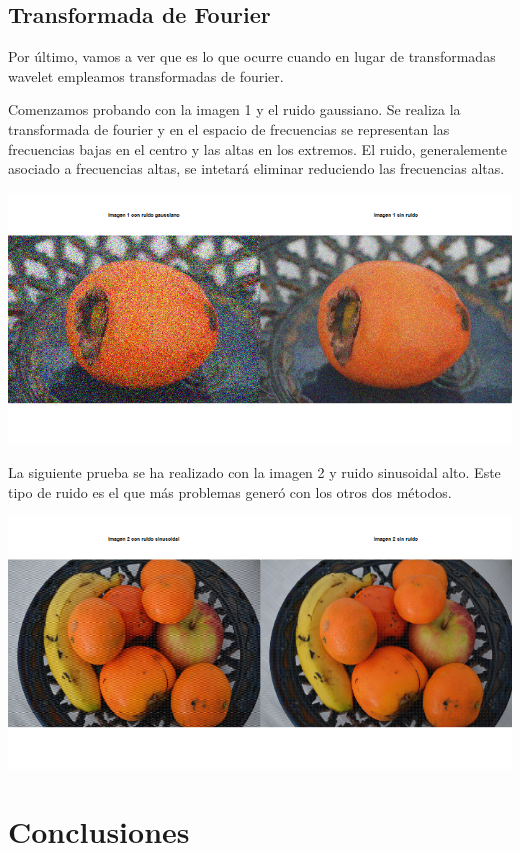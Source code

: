 \documentclass[
]{article}
\begin{document}
\subsection{Transformada de Fourier}\label{transformada-de-fourier}

Por último, vamos a ver que es lo que ocurre cuando en lugar de
transformadas wavelet empleamos transformadas de fourier.

Comenzamos probando con la imagen 1 y el ruido gaussiano. Se realiza la
transformada de fourier y en el espacio de frecuencias se representan
las frecuencias bajas en el centro y las altas en los extremos. El
ruido, generalemente asociado a frecuencias altas, se intetará eliminar
reduciendo las frecuencias altas.

\begin{center}\includegraphics[width=0.4\linewidth,height=0.4\textheight]{fftshift/image1_fourier} \end{center}

La siguiente prueba se ha realizado con la imagen 2 y ruido sinusoidal
alto. Este tipo de ruido es el que más problemas generó con los otros
dos métodos.

\begin{center}\includegraphics[width=0.4\linewidth,height=0.4\textheight]{fftshift/image2_fourier} \end{center}

\section{Conclusiones}\label{conclusiones}
\end{document}
